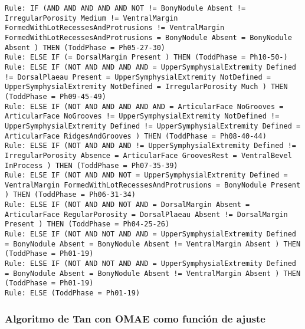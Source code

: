 \begin{lstlisting}
Rule: IF (AND AND AND AND AND NOT != BonyNodule Absent != IrregularPorosity Medium != VentralMargin FormedWithLotRecessesAndProtrusions != VentralMargin FormedWithLotRecessesAndProtrusions = BonyNodule Absent = BonyNodule Absent ) THEN (ToddPhase = Ph05-27-30)
Rule: ELSE IF (= DorsalMargin Present ) THEN (ToddPhase = Ph10-50-)
Rule: ELSE IF (NOT AND AND AND AND = UpperSymphysialExtremity Defined != DorsalPlaeau Present = UpperSymphysialExtremity NotDefined = UpperSymphysialExtremity NotDefined = IrregularPorosity Much ) THEN (ToddPhase = Ph09-45-49)
Rule: ELSE IF (NOT AND AND AND AND AND = ArticularFace NoGrooves = ArticularFace NoGrooves != UpperSymphysialExtremity NotDefined != UpperSymphysialExtremity Defined != UpperSymphysialExtremity Defined = ArticularFace RidgesAndGrooves ) THEN (ToddPhase = Ph08-40-44)
Rule: ELSE IF (NOT AND AND AND != UpperSymphysialExtremity Defined != IrregularPorosity Absence = ArticularFace GroovesRest = VentralBevel InProcess ) THEN (ToddPhase = Ph07-35-39)
Rule: ELSE IF (NOT AND AND NOT = UpperSymphysialExtremity Defined = VentralMargin FormedWithLotRecessesAndProtrusions = BonyNodule Present ) THEN (ToddPhase = Ph06-31-34)
Rule: ELSE IF (NOT AND AND NOT AND = DorsalMargin Absent = ArticularFace RegularPorosity = DorsalPlaeau Absent != DorsalMargin Present ) THEN (ToddPhase = Ph04-25-26)
Rule: ELSE IF (NOT AND NOT AND AND = UpperSymphysialExtremity Defined = BonyNodule Absent = BonyNodule Absent != VentralMargin Absent ) THEN (ToddPhase = Ph01-19)
Rule: ELSE IF (NOT AND NOT AND AND = UpperSymphysialExtremity Defined = BonyNodule Absent = BonyNodule Absent != VentralMargin Absent ) THEN (ToddPhase = Ph01-19)
Rule: ELSE (ToddPhase = Ph01-19)
\end{lstlisting}


\subsubsection{Algoritmo de Tan con OMAE como función de ajuste}

